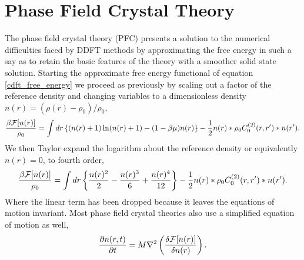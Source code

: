 \section{Phase Field Crystal Theory} %

The phase field crystal theory (PFC) presents a solution to the numerical difficulties
faced by DDFT methods by approximating the free energy in such a say as to retain the
basic features of the theory with a smoother solid state solution. Starting the 
approximate free energy functional of equation \ref{cdft_free_energy} we proceed as
previously by scaling out a factor of the reference density and changing variables
to a dimensionless density $n(r) = (\rho(r) - \rho_0) / \rho_0$,
%
\begin{equation}
    \frac{\beta \mathcal{F}[n(r)]}{\rho_0} = 
        \int dr \left\lbrace (n(r) + 1) \ln( n(r) + 1) - (1 - \beta\mu)n(r) \right\rbrace
        - \frac{1}{2} n(r) \ast \rho_0 C^{(2)}_0(r, r^\prime) \ast n(r^\prime).
\end{equation}
%
We then Taylor expand the logarithm about the reference density or equivalently
$n(r) = 0$, to fourth order,
%
\begin{equation}
    \label{pfc_free_energy} 
    \frac{\beta \mathcal{F}[n(r)]}{\rho_0} =
        \int dr \left\lbrace \frac{n(r)^2}{2} - \frac{n(r)^3}{6} + \frac{n(r)^4}{12} \right\rbrace
        -\frac{1}{2} n(r) \ast \rho_0 C^{(2)}_0(r, r^\prime) \ast n(r^\prime).
\end{equation}
%
Where the linear term has been dropped because it leaves the equations of
motion invariant.  Most phase field crystal theories also use a simplified
equation of motion as well,
%
\begin{equation}
    \label{pfc_eom}
    \frac{\partial n(r, t)}{\partial t} = M \nabla^2 \left(\frac{\delta \mathcal{F}[n(r)]}{\delta n(r)}\right).
\end{equation}
%
